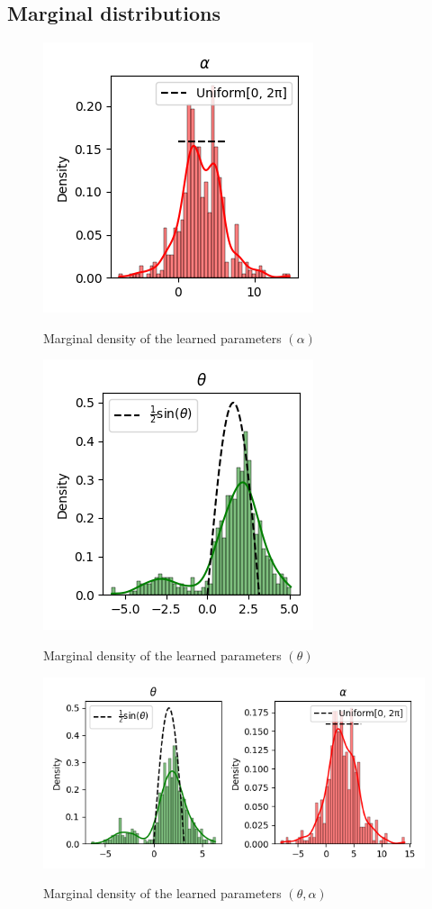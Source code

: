 \documentclass[a4paper,12pt]{article}
\theoremstyle{definition}
\begin{document}

\subsection{Marginal distributions}
\begin{figure}[H]
    \centering
    \includegraphics[height=0.35\textwidth]{VariableSelection/alpha.png}
    \label{fig:Distributions4.1}
    \caption{Marginal density of the learned parameters \((\alpha)\)}
\end{figure}
\begin{figure}[H]
    \centering
    \includegraphics[height=0.35\textwidth]{VariableSelection/theta.png}
    \label{fig:Distributions4.2}
    \caption{Marginal density of the learned parameters \((\theta)\)}
\end{figure}
\begin{figure}[H]
    \centering
    \includegraphics[height=0.35\textwidth]{VariableSelection/theta_alpha.png}
    \label{fig:Distributions4.3}
    \caption{Marginal density of the learned parameters \((\theta,\alpha)\)}
\end{figure}
\end{document}

